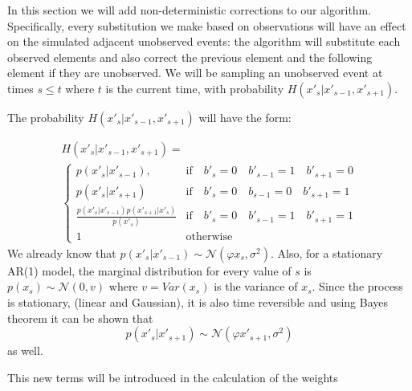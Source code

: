 In this section we will add non-deterministic corrections to our algorithm. Specifically, every substitution we make based on observations will have an effect on the simulated adjacent unobserved events: the algorithm will substitute each observed elements and also correct the previous element and the following element if they are unobserved. We will be sampling an unobserved event at times $s\leq t$ where $t$ is the current time, with probability $H(x'_s|x'_{s-1}, x'_{s+1})$.

The probability $H(x'_s|x'_{s-1}, x'_{s+1})$ will have the form:

\begin{multline*}
H(x'_s|x'_{s-1}, x'_{s+1}) = \\
\begin{cases} p(x'_s|x'_{s-1}), & \mbox{if} \quad b'_s = 0 \quad b'_{s-1} = 1 \quad b'_{s+1} = 0 \\ 
p(x'_s|x'_{s+1}) & \mbox{if} \quad b'_s = 0 \quad b_{s-1} = 0 \quad b'_{s+1} = 1\\
\frac{p(x'_s|x'_{s-1})p(x'_{s+1}|x'_s)}{p(x'_s)} & \mbox{if} \quad b'_s = 0 \quad b'_{s-1} = 1 \quad b'_{s+1} = 1\\
1 & \mbox{otherwise} \end{cases}
\end{multline*}
We already know that $p(x'_s|x'_{s-1}) \sim \mathcal{N} (\varphi x_{s}, \sigma^{2})$. Also, for a stationary AR(1) model, the marginal distribution for every value of $s$ is $p(x_{s}) \sim \mathcal{N}(0, v)$ where $v = Var(x_s)$ is the variance of $x_s$. Since the process is stationary, (linear and Gaussian), it is also time reversible and using Bayes theorem it can be shown that 
\[
p(x'_{s}|x'_{s+1}) \sim \mathcal{N} (\varphi x'_{s+1}, \sigma^{2})
\]
as well.

This new terms will be introduced in the calculation of the weights



